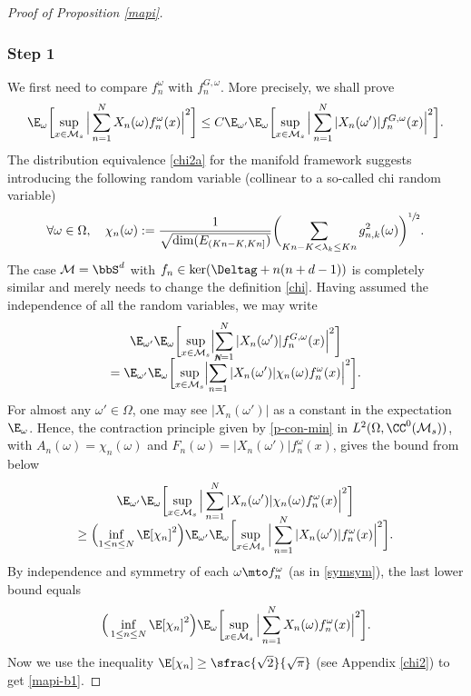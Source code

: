 \skpt
\begin{proof}[Proof of Proposition \ref{mapi}]
\vspace*{-.5\baselineskip}
\subsubsection*{Step 1} We first need to compare $f_n^\omega$ with $f_n^{G,\omega}$.
More precisely, we shall prove
\begin{equation}\label{mapi-b1}
\E_{\omega}\biggl[\sup_{x\in \mathcal{M}_s}\Big|\sum_{n=1}^N X_n(\omega)f_n^{\omega}(x)\Big|^{2} \biggr]\leq C\E_{\omega'}\E_{\omega}\biggl[\sup_{x\in \mathcal{M}_s}\Big| \sum_{n=1}^N |X_n(\omega')| f_n^{G,\omega}(x) \Big|^2 \biggr].
\end{equation}
The distribution equivalence \eqref{chi2a} for the manifold framework suggests introducing the following random variable (collinear to a so-called chi random variable)
\begin{equation}\label{chi}
\forall \omega\in \Omega,\quad \chi_n(\omega):=\frac{1}{\sqrt{\dim(E_{(Kn-K,Kn]})}}\biggl(\sum_{Kn-K<\lambda_k\leq Kn} g_{n,k}^2(\omega)\biggr)^{\sfrac{1}{2}}.\end{equation}
The case $\mathcal{M}=\bbS^d$ with $f_n\in \ker(\Deltag+n(n+d-1))$ is completely similar and merely needs to change the definition \eqref{chi}.
Having assumed the independence of all the random variables, we may write\vspace*{-3pt}
\begin{multline}\label{chi-g}
\E_{\omega'}\E_{\omega}\biggl[\sup_{x\in \mathcal{M}_s}\Bigl| \sum_{n=1}^N |X_n(\omega')| f_n^{G,\omega}(x) \Bigr|^2 \biggr]\\[-10pt]
=\E_{\omega'}\E_\omega\biggl[\sup_{x\in \mathcal{M}_s}\Bigl|\sum_{n=1}^N |X_n(\omega')| \chi_n(\omega) f_n^{\omega}(x)\Bigr|^2 \biggr].
\end{multline}
For almost any $\omega'\in \Omega$, one may see $|X_n(\omega')|$ as a constant in the expectation $\E_{\omega}$.
Hence, the contraction principle given by \eqref{p-con-min} in $L^2(\Omega,\CC^0(\mathcal{M}_s))$, with $A_n(\omega)=\chi_n(\omega)$ and $F_n(\omega)=|X_n(\omega')|f_n^{\omega}(x)$, gives the bound from below\vspace*{-3pt}
\begin{multline*}
\E_{\omega'}\E_\omega\biggl[\sup_{x\in \mathcal{M}_s}\Big|\sum_{n=1}^N |X_n(\omega')| \chi_n(\omega) f_n^{\omega}(x)\Big|^2 \biggr]\\[-8pt]
\geq \Bigl(\inf_{1\leq n\leq N} \E[\chi_n]^2 \Bigr)
\E_{\omega'}\E_\omega\biggl[\sup_{x\in \mathcal{M}_s}\Big|\sum_{n=1}^N |X_n(\omega')| f_n^{\omega}(x)\Big|^2 \biggr].
\end{multline*}
By independence and symmetry of each $\omega\mto f_n^\omega$ (as in \eqref{symsym}), the last lower bound equals\vspace*{-5pt}
\begin{equation*}
\Big(\inf_{1\leq n\leq N} \E[\chi_n]^2 \Big)
\E_\omega\biggl[\sup_{x\in \mathcal{M}_s}\Big|\sum_{n=1}^N X_n(\omega) f_n^{\omega}(x)\Big|^2 \biggr].
\end{equation*}
Now we use the inequality $\E[\chi_n]\geq \sfrac{\sqrt{2}}{\sqrt{\pi}}$ (see Appendix \ref{chi2}) to get \eqref{mapi-b1}.


\end{proof}
